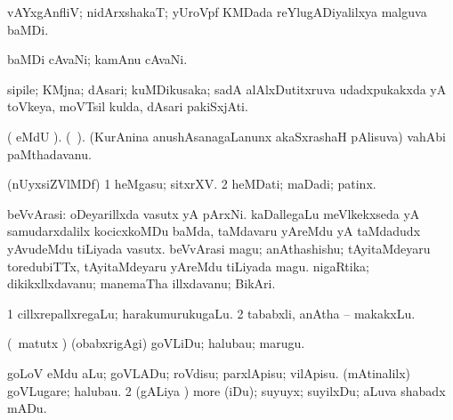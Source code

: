 \bentry
{} 
\gl{\nA}
\bmng
 vAYxgAnfliV; nidArxshakaT; yUroVpf KMDada reYlugADiyalilxya malguva baMDi. 
\emng
\eentry

\bentry
{} 
\gl{\nA}
\expl{}
\bmng
baMDi cAvaNi; kamAnu cAvaNi. 
\emng
\eentry

\bentry
{} 
\gl{\nA}
\expl{}
\bmng
{} 
\emng
\eentry

\bentry
{} 
\gl{\nA}
\expl{}
\bmng
sipile; KMjna; dAsari; kuMDikusaka; sadA alAlxDutitxruva udadxpukakxda yA toVkeya, moVTsil kulda, dAsari pakiSxjAti. 
\emng
\eentry

\bentry
{} 
\gl{\nA}
\expl{}
\bmng
( eMdU \parx). (\bava\ ). (KurAnina anushAsanagaLanunx akaSxrashaH pAlisuva) vahAbi paMthadavanu. 
\emng
\eentry

\bentry
{} 
\gl{\nA}
\bmng
(nUyxsiZVlMDf) 
\bnum
\num{1} heMgasu; sitxrXV. 
\num{2} heMDati; maDadi; patinx. 
\enum
\emng
\eentry

\bentry
{} 
\gl{\nA}
\expl{}
\bmng
{} 
\emng
\eentry

\bentry
{} 
\gl{\nA}
\expl{}
\bmng
beVvArasi: 
\banum
{} oDeyarillxda vasutx yA pArxNi. 
 kaDallegaLu meVlkekxseda yA samudarxdalilx kocicxkoMDu baMda, taMdavaru yAreMdu yA taMdadudx yAvudeMdu tiLiyada vasutx. 
 beVvArasi magu; anAthashishu; tAyitaMdeyaru toredubiTTx, tAyitaMdeyaru yAreMdu tiLiyada magu. 
 nigaRtika; dikikxllxdavanu; manemaTha illxdavanu; BikAri. 
\eanum
\emng
\eentry

\bentry
{} 
\gl{\nA}
\expl{}
\bmng
\bnum
\num{1} cillxrepallxregaLu; harakumurukugaLu. 
\num{2} tababxli, anAtha -- makakxLu. 
\enum
\emng
\eentry

\bentry
{} 
\gl{\sakirx}
\expl{}
\bmng
(\kAparx\ matutx \alaMshA) (obabxrigAgi) goVLiDu; halubau; marugu. 
\emng

\noindent 
\gl{\akirx}
\expl{}
\bmng
\bnum
{} 
\banum
{} goLoV eMdu aLu; goVLADu; roVdisu; parxlApisu; vilApisu. 
 (mAtinalilx) goVLugare; halubau. 
\eanum
\numie
\num{2} (gALiya \vi) more (iDu); suyuyx; suyilxDu; aLuva shabadx mADu. 
\enum
\emng
\eentry

